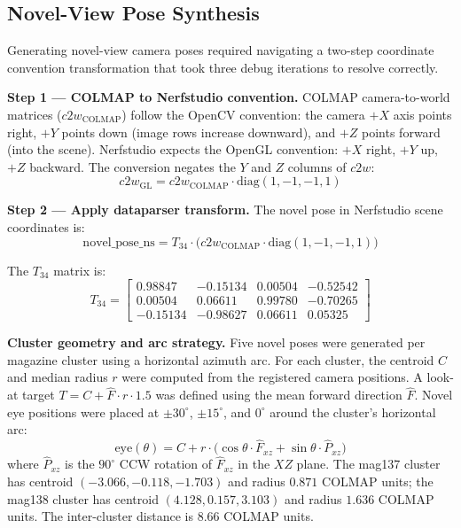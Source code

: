 \documentclass[12pt]{article}
\begin{document}
\subsection{Novel-View Pose Synthesis}
\label{subsec:novel_poses}

Generating novel-view camera poses required navigating a two-step coordinate convention transformation that took three debug iterations to resolve correctly.

\textbf{Step 1 --- COLMAP to Nerfstudio convention.} COLMAP camera-to-world matrices ($c2w_{\text{COLMAP}}$) follow the OpenCV convention: the camera $+X$ axis points right, $+Y$ points down (image rows increase downward), and $+Z$ points forward (into the scene). Nerfstudio expects the OpenGL convention: $+X$ right, $+Y$ up, $+Z$ backward. The conversion negates the $Y$ and $Z$ columns of $c2w$:
\begin{equation}
    c2w_{\text{GL}} = c2w_{\text{COLMAP}} \cdot \mathrm{diag}(1, -1, -1, 1)
\end{equation}

\textbf{Step 2 --- Apply dataparser transform.} The novel pose in Nerfstudio scene coordinates is:
\begin{equation}
    \text{novel\_pose\_ns} = T_{34} \cdot \bigl(c2w_{\text{COLMAP}} \cdot \mathrm{diag}(1, -1, -1, 1)\bigr)
\end{equation}

The $T_{34}$ matrix is:
\begin{equation}
T_{34} = \begin{bmatrix}
 0.98847 & -0.15134 &  0.00504 & -0.52542 \\
 0.00504 &  0.06611 &  0.99780 & -0.70265 \\
-0.15134 & -0.98627 &  0.06611 &  0.05325
\end{bmatrix}
\end{equation}

\textbf{Cluster geometry and arc strategy.} Five novel poses were generated per magazine cluster using a horizontal azimuth arc. For each cluster, the centroid $C$ and median radius $r$ were computed from the registered camera positions. A look-at target $T = C + \hat{F} \cdot r \cdot 1.5$ was defined using the mean forward direction $\hat{F}$. Novel eye positions were placed at $\pm 30^\circ$, $\pm 15^\circ$, and $0^\circ$ around the cluster's horizontal arc:
\begin{equation}
    \text{eye}(\theta) = C + r \cdot \bigl(\cos\theta \cdot \hat{F}_{xz} + \sin\theta \cdot \hat{P}_{xz}\bigr)
\end{equation}
where $\hat{P}_{xz}$ is the $90^\circ$ CCW rotation of $\hat{F}_{xz}$ in the $XZ$ plane. The mag137 cluster has centroid $(-3.066, -0.118, -1.703)$ and radius $0.871$ COLMAP units; the mag138 cluster has centroid $(4.128, 0.157, 3.103)$ and radius $1.636$ COLMAP units. The inter-cluster distance is 8.66 COLMAP units.
\end{document}
